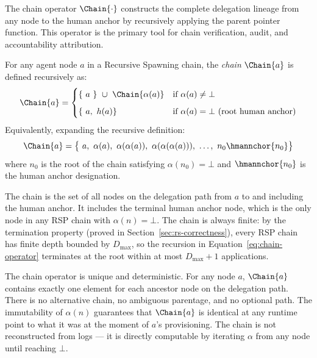 The chain operator $\Chain{\cdot}$ constructs the complete delegation lineage from any node to the human anchor by recursively applying the parent pointer function. This operator is the primary tool for chain verification, audit, and accountability attribution.

\begin{dfn}\label{def:chain-operator}
For any agent node $a$ in a Recursive Spawning chain, the \emph{chain} $\Chain{a}$ is defined recursively as:
\begin{equation}
\Chain{a} =
\begin{cases}
\{\ a\ \} \ \cup \ \Chain{\alpha(a)} & \text{if } \alpha(a) \neq \bot \\[6pt]
\{\ a,\ h(a) \} & \text{if } \alpha(a) = \bot \ \text{(root human anchor)}
\end{cases}
\label{eq:chain-operator}
\end{equation}
Equivalently, expanding the recursive definition:
\begin{equation}
\Chain{a} = \bigl\{\ a,\ \alpha(a),\ \alpha(\alpha(a)),\ \alpha(\alpha(\alpha(a))),\ \ldots,\ n_0 \hmannchor{n_0} \bigr\}
\label{eq:chain-expanded}
\end{equation}
where $n_0$ is the root of the chain satisfying $\alpha(n_0) = \bot$ and $\hmannchor{n_0}$ is the human anchor designation.
\end{dfn}

The chain is the set of all nodes on the delegation path from $a$ to and including the human anchor. It includes the terminal human anchor node, which is the only node in any RSP chain with $\alpha(n) = \bot$. The chain is always finite: by the termination property (proved in Section~\ref{sec:rs-correctness}), every RSP chain has finite depth bounded by $D_{\max}$, so the recursion in Equation~\ref{eq:chain-operator} terminates at the root within at most $D_{\max} + 1$ applications.

The chain operator is unique and deterministic. For any node $a$, $\Chain{a}$ contains exactly one element for each ancestor node on the delegation path. There is no alternative chain, no ambiguous parentage, and no optional path. The immutability of $\alpha(n)$ guarantees that $\Chain{a}$ is identical at any runtime point to what it was at the moment of $a$'s provisioning. The chain is not reconstructed from logs — it is directly computable by iterating $\alpha$ from any node until reaching $\bot$.

